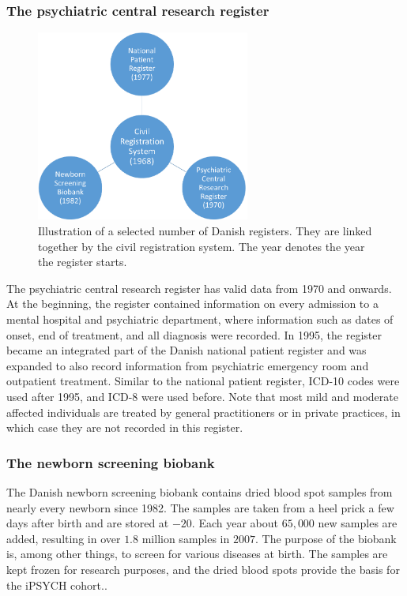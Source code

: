 \subsubsection{The psychiatric central research register}
\begin{figure}
	\includegraphics[width=7cm]{intro/registers.png}
	\caption{Illustration of a selected number of Danish registers. They are linked together by the civil registration system. The year denotes the year the register starts.}
	\label{fig:registerBubbles}
\end{figure}

The psychiatric central research register has valid data from 1970 and onwards. At the beginning, the register contained information on every admission to a mental hospital and psychiatric department, where information such as dates of onset, end of treatment, and all diagnosis were recorded. In 1995, the register became an integrated part of the Danish national patient register and was expanded to also record information from psychiatric emergency room and outpatient treatment. Similar to the national patient register, ICD-10 codes were used after 1995, and ICD-8 were used before. Note that most mild and moderate affected individuals are treated by general practitioners or in private practices, in which case they are not recorded in this register.\cite{mors2011danish}


\subsubsection{The newborn screening biobank}
The Danish newborn screening biobank contains dried blood spot samples from nearly every newborn since 1982. The samples are taken from a heel prick a few days after birth and are stored at $ -20 $\textcelsius. Each year about $ 65,000 $ new samples are added, resulting in over $ 1.8 $ million samples in $ 2007 $. The purpose of the biobank is, among other things, to screen for various diseases at birth. The samples are kept frozen for research purposes, and the dried blood spots provide the basis for the iPSYCH cohort.\cite{norgaard2007storage}.

